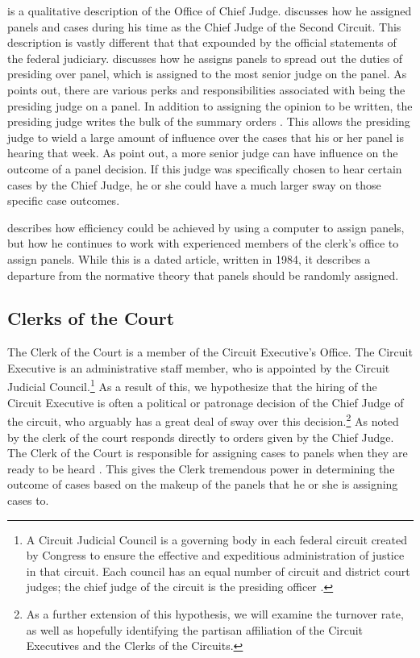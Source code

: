 \documentclass[12pt]{article}
\begin{document}
\citet{feinberg1984office} is a qualitative description of the Office of Chief Judge.  \citet{feinberg1984office} discusses how he assigned panels and cases during his time as the Chief Judge of the Second Circuit.  This description is vastly different that that expounded by the official statements of the federal judiciary.  \citet[374]{feinberg1984office}  discusses how he assigns panels to spread out the duties of presiding over panel, which is assigned to the most senior judge on the panel.  As \citeauthor{feinberg1984office} points out, there are various perks and responsibilities associated with being the presiding judge on a panel.  In addition to assigning the opinion to be written, the presiding judge writes the bulk of the summary orders \citep[375]{feinberg1984office}.  This allows the presiding judge to wield a large amount of influence over the cases that his or her panel is hearing that week.  As \citet{landes1998judicial} point out, a more senior judge can have influence on the outcome of a panel decision.  If this judge was specifically chosen to hear certain cases by the Chief Judge, he or she could have a much larger sway on those specific case outcomes.

\citet[387]{feinberg1984office} describes how efficiency could be achieved by using a computer to assign panels, but how he continues to work with experienced members of the clerk's office to assign panels.  While this is a dated article, written in 1984, it describes a departure from the normative theory that panels should be randomly assigned.

\subsection*{Clerks of the Court}
The Clerk of the Court is a member of the Circuit Executive's Office.  The Circuit Executive is an administrative staff member, who is appointed by the Circuit Judicial Council.\footnote{A Circuit Judicial Council is a governing body in each federal circuit created by Congress to ensure the effective and expeditious administration of justice in that circuit. Each council has an equal number of circuit and district court judges; the chief judge of the circuit is the presiding officer \cite{FJC}.}  As a result of this, we hypothesize that the hiring of the Circuit Executive is often a political or patronage decision of the Chief Judge of the circuit, who arguably has a great deal of sway over this decision.\footnote{As a further extension of this hypothesis, we will examine the turnover rate, as well as hopefully identifying the partisan affiliation of the Circuit Executives and the Clerks of the Circuits.}  As noted by \cite{Atkins1974} the clerk of the court responds directly to orders given by the Chief Judge.  The Clerk of the Court is responsible for assigning cases to panels when they are ready to be heard \cite{Atkins1974,feinberg1984office,FJC}.  This gives the Clerk tremendous power in determining the outcome of cases based on the makeup of the panels that he or she is assigning cases to.  
\end{document}
